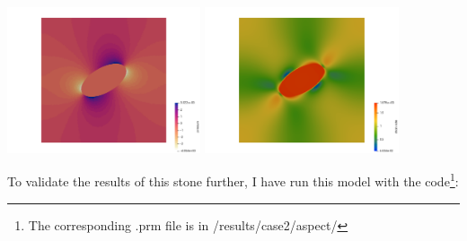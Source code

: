 \begin{center}
\includegraphics[width=5.7cm]{python_codes/fieldstone_142/results/case2/press}
\includegraphics[width=5.7cm]{python_codes/fieldstone_142/results/case2/sr}
\end{center}

To validate the results of this stone further, I have run this model with the \aspect
code\footnote{The corresponding .prm file is in /results/case2/aspect/}:

